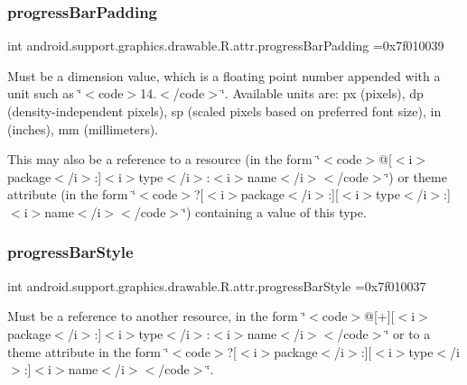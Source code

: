\subsubsection{\texorpdfstring{progress\+Bar\+Padding}{progressBarPadding}}
{\footnotesize\ttfamily int android.\+support.\+graphics.\+drawable.\+R.\+attr.\+progress\+Bar\+Padding =0x7f010039\hspace{0.3cm}{\ttfamily [static]}}

Must be a dimension value, which is a floating point number appended with a unit such as \char`\"{}$<$code$>$14.\+5sp$<$/code$>$\char`\"{}. Available units are\+: px (pixels), dp (density-\/independent pixels), sp (scaled pixels based on preferred font size), in (inches), mm (millimeters). 

This may also be a reference to a resource (in the form \char`\"{}$<$code$>$@\mbox{[}$<$i$>$package$<$/i$>$\+:\mbox{]}$<$i$>$type$<$/i$>$\+:$<$i$>$name$<$/i$>$$<$/code$>$\char`\"{}) or theme attribute (in the form \char`\"{}$<$code$>$?\mbox{[}$<$i$>$package$<$/i$>$\+:\mbox{]}\mbox{[}$<$i$>$type$<$/i$>$\+:\mbox{]}$<$i$>$name$<$/i$>$$<$/code$>$\char`\"{}) containing a value of this type. \mbox{\label{classandroid_1_1support_1_1graphics_1_1drawable_1_1R_1_1attr_a2f7cd4d4db93244689916e08f871ee44}} 
\subsubsection{\texorpdfstring{progress\+Bar\+Style}{progressBarStyle}}
{\footnotesize\ttfamily int android.\+support.\+graphics.\+drawable.\+R.\+attr.\+progress\+Bar\+Style =0x7f010037\hspace{0.3cm}{\ttfamily [static]}}

Must be a reference to another resource, in the form \char`\"{}$<$code$>$@\mbox{[}+\mbox{]}\mbox{[}$<$i$>$package$<$/i$>$\+:\mbox{]}$<$i$>$type$<$/i$>$\+:$<$i$>$name$<$/i$>$$<$/code$>$\char`\"{} or to a theme attribute in the form \char`\"{}$<$code$>$?\mbox{[}$<$i$>$package$<$/i$>$\+:\mbox{]}\mbox{[}$<$i$>$type$<$/i$>$\+:\mbox{]}$<$i$>$name$<$/i$>$$<$/code$>$\char`\"{}. \mbox{\label{classandroid_1_1support_1_1graphics_1_1drawable_1_1R_1_1attr_a28356977666d171563b8bd51654ed03b}} 
